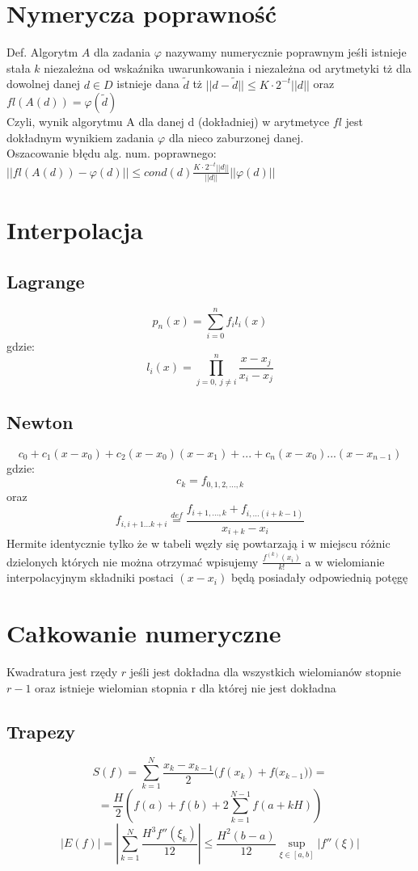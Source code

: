 \documentclass[10pt,twocolumn]{article}
\begin{document}
\begin{flushleft}
\section{Nymerycza poprawność}
Def. Algorytm $A$ dla zadania $\varphi$ nazywamy numerycznie poprawnym jeśłi istnieje stała $k$ niezależna od wskaźnika uwarunkowania i niezależna od arytmetyki tż dla dowolnej danej $d \in D$ istnieje dana $\widetilde{d}$ tż $||d-\widetilde{d}|| \leq K\cdot 2^{-t}||d||$ oraz $fl(A(d)) = \varphi(\widetilde{d})$\\
Czyli, wynik algorytmu A dla danej d (dokładniej) w arytmetyce $fl$ jest dokładnym wynikiem zadania $\varphi$ dla nieco zaburzonej danej.\\
Oszacowanie błędu alg. num. poprawnego:\\
$||fl(A(d)) - \varphi(d)|| \leq cond(d) \frac{K\cdot2^{-t}||d||}{||d||}||\varphi(d)||$

\section{Interpolacja}
\subsection{Lagrange}
$$p_{n}(x) = \sum_{i = 0}^{n}f_{i}l_{i}(x)$$
gdzie: $$l_i(x) = \prod_{{j = 0},\ {j \neq i}}^{n} \frac{x - x_{j}}{x_{i}-x_{j}}$$
\subsection{Newton}
$$c_{0} + c_{1}(x-x_{0}) + c_{2}(x-x_{0})(x-x_{1}) + ... + c_{n}(x-x_{0})...(x-x_{n-1})$$
gdzie: $$c_{k} = f_{0,1,2,...,k}$$ oraz $$f_{i,i+1...k+i} \stackrel{def}{=} \frac{f_{i+1,...,k} + f_{i,...(i+k-1)}}{x_{i+k}-x_{i}}$$
Hermite identycznie tylko że w tabeli węzły się powtarzają i w miejscu różnic dzielonych których nie można otrzymać wpisujemy $\frac{f^{(k)}(x_i)}{k!}$ a w wielomianie interpolacyjnym składniki postaci $(x-x_i)$ będą posiadały odpowiednią potęgę

\section{Całkowanie numeryczne}
Kwadratura jest rzędy $r$ jeśli jest dokładna dla wszystkich wielomianów stopnie $r-1$ oraz istnieje wielomian stopnia r dla której nie jest dokładna\\
\subsection{Trapezy}
$$S(f) = \sum_{k=1}^{N} \frac{x_k-x_{k-1}}{2}{(f(x_k)+f(x_{k-1}})) =$$ $$=\frac{H}{2} \left(f(a)+f(b)+2\sum_{k=1}^{N-1}f(a+kH)\right)$$
$$|E(f)| = \left| \sum_{k=1}^{N}\frac{H^3f''(\xi_k)}{12} \right| \leq \frac{H^2(b-a)}{12}\underset{\xi \in [a,b]}{\sup}|f''(\xi)|$$

\end{flushleft}
\end{document}
